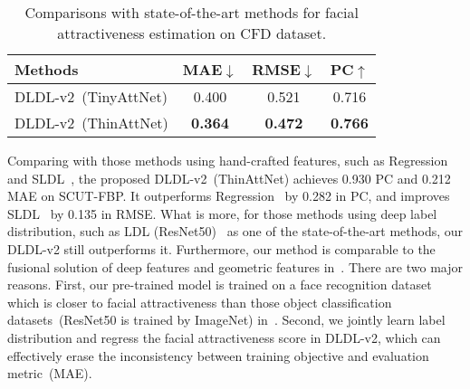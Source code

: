 \documentclass[5p,times,twocolumn]{elsarticle}
\begin{document}
\begin{table}
	\centering
	\small
	\caption{Comparisons with state-of-the-art methods for facial attractiveness estimation on CFD dataset. }\label{tab:sotacfd}
	\begin{tabular}{|@{\;}l@{\;}| *{3}{@{\;}c@{\;}}|}
		\hline
		Methods     &MAE$\downarrow$   &RMSE$\downarrow$  & PC$\uparrow$\\
		\hline
		DLDL-v2~(TinyAttNet)                &0.400 &0.521 &0.716\\
	        DLDL-v2~(ThinAttNet)              &\textbf{0.364} &\textbf{0.472} &\textbf{0.766}\\
		\hline
	\end{tabular}
\end{table}


Comparing with those methods using hand-crafted features, such as Regression~\cite{xie2015scut} and SLDL~\cite{rensense}, the proposed DLDL-v2~(ThinAttNet) achieves 0.930 PC and 0.212 MAE on SCUT-FBP. It outperforms Regression~\cite{xie2015scut} by 0.282 in PC, and improves SLDL~\cite{rensense} by 0.135 in RMSE. What is more, for those methods using deep label distribution, such as LDL (ResNet50)~\cite{fan2017label} as one of the state-of-the-art methods, our DLDL-v2 still outperforms it. Furthermore, our method is comparable to the fusional solution of deep features and geometric features in~\cite{fan2017label}. There are two major reasons. First, our pre-trained model is trained on a face recognition dataset which is closer to facial attractiveness than those object classification datasets~(ResNet50 is trained by ImageNet) in~\cite{fan2017label}. Second, we jointly learn label distribution and regress the facial attractiveness score in DLDL-v2, which can effectively erase the inconsistency between training objective and evaluation metric~(MAE).

\iffalse
From the model parameters and inference time of view, as reported in Table~\ref{tab:csoaatt}, the performance of our DLDL-v2~(ThinAttNet) with 6$\times$ fewer parameters and 2.1$\times$ faster speed is comparable to that of the state-of-the-art~\cite{fan2017label} which is a fusional solution of deep features and geometric features. Meanwhile, we also report the performance of DLDL-v2~(TinyAttNet) with 26$\times$ fewer parameters and 4.5$\times$ faster inference speed, which is still comparable to the one using only ResNet50 in~\cite{fan2017label}.
\fi
\end{document}
